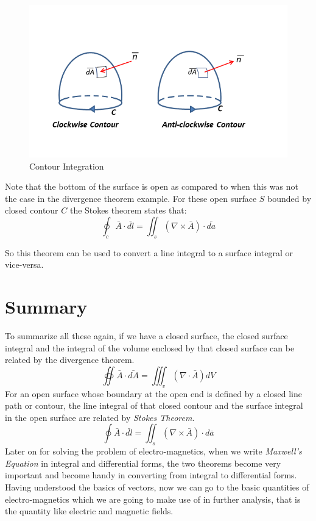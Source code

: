 \begin{figure}
\centering
\includegraphics[width=1.2\linewidth]{./graphics/contour_integral}
\caption{Contour Integration}
\end{figure}

Note that the bottom of the surface is open as compared to when this was not the case in the divergence theorem example. For these open surface $S$ bounded by closed contour $C$ the Stokes theorem states that:
\begin{equation}
\oint_c \bar{A} \cdot \bar{dl} = \iint_s  (\nabla \times \bar{A})\cdot\bar{da}
\end{equation}

So this theorem can be used to convert a line integral to a surface integral or vice-versa.

\section{Summary}
To summarize all these again, if we have a closed surface, the closed surface integral and the integral of the volume enclosed by that closed surface can be related by the divergence theorem.
\begin{equation}
\oiint \bar{A}\cdot\bar{dA} = \iiint_v(\nabla\cdot\bar{A})dV
\end{equation}
For an open surface whose boundary at the open end is defined by a closed line path or contour, the line integral of that closed contour and the surface integral in the open surface are related by \emph{Stokes Theorem}.
\begin{equation}
\oint\bar{A}\cdot\bar{dl} = \iint_s(\nabla\times\bar{A})\cdot d\bar{a}
\end{equation}	
Later on for solving the problem of electro-magnetics, when we write \emph{Maxwell's Equation} in integral and differential forms, the two theorems become very important and become handy in converting from integral to differential forms. Having understood the basics of vectors, now we can go to the basic quantities of electro-magnetics which we are going to make use of in further analysis, that is the quantity like electric and magnetic fields.

